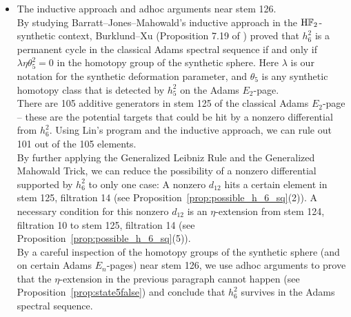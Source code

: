 \documentclass{amsart}
\numberwithin{equation}{section}
\newcommand{\HF}{\mathrm{H}\bF_2}
\begin{document}
\begin{itemize}
    \noindent With the Generalized Leibniz Rule and the Generalized Mahowald Trick, Lin’s program becomes even more powerful, enabling the derivation of additional differentials. The program rigorously verifies the conditions of the relevant theorems and generates human-readable proofs \cite{LWXZenodo} for all differentials computed by the machine. In the Appendix, readers will find tables of Adams differentials that are used in the proof of the main Theorem \ref{thm:h_6_sq}.\\

    \item The inductive approach and adhoc arguments near stem 126.\\

    \noindent By studying Barratt--Jones--Mahowald's inductive approach \cite{BJMinduction} in the $\HF$-synthetic context, Burklund--Xu (Proposition 7.19 of \cite{BurklundXu}) proved that $h_6^2$ is a permanent cycle in the classical Adams spectral sequence if and only if $\lambda \eta \theta_5^2 = 0$ in the homotopy group of the synthetic sphere. Here $\lambda$ is our notation for the synthetic deformation parameter, and $\theta_5$ is any synthetic homotopy class that is detected by $h_5^2$ on the Adams $E_2$-page.   \\

    \noindent There are 105 additive generators in stem 125 of the classical Adams $E_2$-page -- these are the potential targets that could be hit by a nonzero differential from $h_6^2$. Using Lin's program and the inductive approach, we can rule out 101 out of the 105 elements.\\
    
    \noindent By further applying the Generalized Leibniz Rule and the Generalized Mahowald Trick, we can reduce the possibility of a nonzero differential supported by $h_6^2$ to only one case: A nonzero $d_{12}$ hits a certain element in stem 125, filtration 14 (see Proposition~\ref{prop:possible_h_6_sq}(2)). A necessary condition for this nonzero $d_{12}$ is an $\eta$-extension from stem 124, filtration 10 to stem 125, filtration 14 (see Proposition~\ref{prop:possible_h_6_sq}(5)). \\
    
    \noindent By a careful inspection of the homotopy groups of the synthetic sphere (and on certain Adams $E_n$-pages) near stem 126, we use adhoc arguments to prove that the $\eta$-extension in the previous paragraph cannot happen (see Proposition~\ref{prop:state5false}) and conclude that $h_6^2$ survives in the Adams spectral sequence. \\
\end{itemize} 
\end{document}
